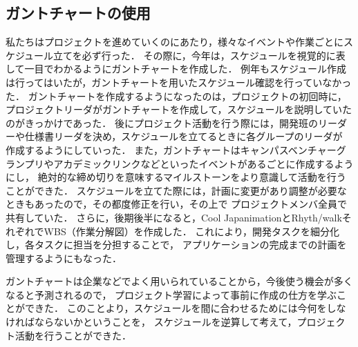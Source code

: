 \subsection{ガントチャートの使用}
\par
私たちはプロジェクトを進めていくのにあたり，様々なイベントや作業ごとにスケジュール立てを必ず行った．
その際に，今年は，スケジュールを視覚的に表して一目でわかるようにガントチャートを作成した．
例年もスケジュール作成は行ってはいたが，ガントチャートを用いたスケジュール確認を行っていなかった．
ガントチャートを作成するようになったのは，プロジェクトの初回時に，プロジェクトリーダがガントチャートを作成して，スケジュールを説明していたのがきっかけであった．
後にプロジェクト活動を行う際には，開発班のリーダーや仕様書リーダを決め，スケジュールを立てるときに各グループのリーダが
作成するようにしていった．
また，ガントチャートはキャンパスベンチャーグランプリやアカデミックリンクなどといったイベントがあるごとに作成するようにし，
絶対的な締め切りを意味するマイルストーンをより意識して活動を行うことができた．
スケジュールを立てた際には，計画に変更があり調整が必要なときもあったので，その都度修正を行い，その上で
プロジェクトメンバ全員で共有していた．
さらに，後期後半になると，Cool JapanimationとRhyth/walkそれぞれでWBS（作業分解図）を作成した．
これにより，開発タスクを細分化し，各タスクに担当を分担することで，
アプリケーションの完成までの計画を管理するようにもなった．
\par
ガントチャートは企業などでよく用いられていることから，今後使う機会が多くなると予測されるので，
プロジェクト学習によって事前に作成の仕方を学ぶことができた．
このことより，スケジュールを間に合わせるためには今何をしなければならないかということを，
スケジュールを逆算して考えて，プロジェクト活動を行うことができた．
